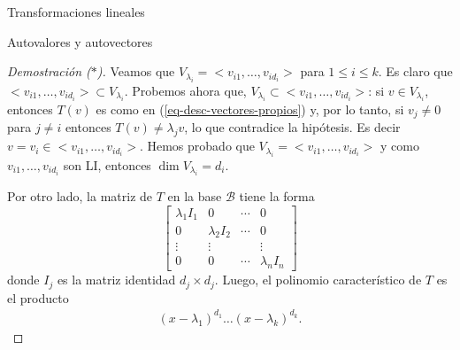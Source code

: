 \documentclass[a4paper,12pt,twoside,spanish]{amsbook}
\theoremstyle{definition}
\theoremstyle{remark}
\begin{document}
\begin{chapter}{Transformaciones lineales}
\begin{section}{Autovalores y autovectores}
\begin{proof}[Demostración ($*$)]
			Veamos que $V_{\lambda_i} = <v_{i1},\ldots,v_{id_i}>$ para $1 \le i \le k$. Es claro que  $<v_{i1},\ldots,v_{id_i}> \subset V_{\lambda_i}$. Probemos  ahora que,  $V_{\lambda_i} \subset <v_{i1},\ldots,v_{id_i}>$: si  $v \in V_{\lambda_i}$,  entonces $T(v)$ es como en (\ref{eq-desc-vectores-propios}) y, por lo tanto, si $v_j \ne 0$ para $j\not=i$ entonces $T(v) \ne \lambda_j v$, lo que contradice la hipótesis. Es decir $v = v_i \in <v_{i1},\ldots,v_{id_i}>$. Hemos probado que    $V_{\lambda_i} = <v_{i1},\ldots,v_{id_i}>$ y como $v_{i1},\ldots,v_{id_i}$ son LI, entonces $\dim V_{\lambda_i} = d_i$.
			
			Por otro lado, la matriz de $T$ en la base $\mathcal{B}$ tiene la forma
			\begin{equation*}
				\begin{bmatrix}
				\lambda_1 I_1 &0&\cdots&0 \\0&\lambda_2 I_2&\cdots&0 \\\vdots&\vdots&&\vdots \\0&0&\cdots&\lambda_n I_n 
				\end{bmatrix}
			\end{equation*}
			donde $I_j$ es la matriz identidad $d_j \times d_j$. Luego,  el polinomio característico de $T$ es el producto
			\begin{align*}
			(x -\lambda_1)^{d_1}\ldots(x -\lambda_k)^{d_k}.
			\end{align*}
		\end{proof}
	

\end{section}
\end{chapter}
\end{document}
